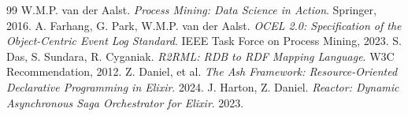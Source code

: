 \documentclass[12pt,a4paper,oneside]{book}
\begin{document}
\begin{thebibliography}{99}
W.M.P. van der Aalst. \emph{Process Mining: Data Science in Action}. Springer, 2016.
A. Farhang, G. Park, W.M.P. van der Aalst. \emph{OCEL 2.0: Specification of the Object-Centric Event Log Standard}. IEEE Task Force on Process Mining, 2023.
S. Das, S. Sundara, R. Cyganiak. \emph{R2RML: RDB to RDF Mapping Language}. W3C Recommendation, 2012.
Z. Daniel, et al. \emph{The Ash Framework: Resource-Oriented Declarative Programming in Elixir}. 2024.
J. Harton, Z. Daniel. \emph{Reactor: Dynamic Asynchronous Saga Orchestrator for Elixir}. 2023.
\end{thebibliography}
\end{document}
